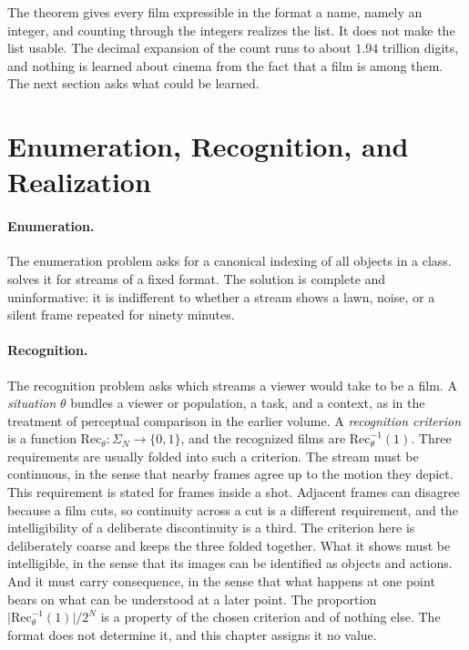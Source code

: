\documentclass[11pt,twoside,openright]{book}
\theoremstyle{plain}
\theoremstyle{definition}
\theoremstyle{remark}
\begin{document}
The theorem gives every film expressible in the format a name, namely an integer, and counting through the integers realizes the list. It does not make the list usable. The decimal expansion of the count runs to about $1.94$ trillion digits, and nothing is learned about cinema from the fact that a film is among them. The next section asks what could be learned.

\section{Enumeration, Recognition, and Realization}\label{sec:three}

\paragraph{Enumeration.} The enumeration problem asks for a canonical indexing of all objects in a class.  solves it for streams of a fixed format. The solution is complete and uninformative: it is indifferent to whether a stream shows a lawn, noise, or a silent frame repeated for ninety minutes.

\paragraph{Recognition.} The recognition problem asks which streams a viewer would take to be a film. A \emph{situation} $\theta$ bundles a viewer or population, a task, and a context, as in the treatment of perceptual comparison in the earlier volume. A \emph{recognition criterion} is a function $\mathrm{Rec}_\theta:\Sigma_N\to\{0,1\}$, and the recognized films are $\mathrm{Rec}_\theta^{-1}(1)$. Three requirements are usually folded into such a criterion. The stream must be continuous, in the sense that nearby frames agree up to the motion they depict. This requirement is stated for frames inside a shot. Adjacent frames can disagree because a film cuts, so continuity across a cut is a different requirement, and the intelligibility of a deliberate discontinuity is a third. The criterion here is deliberately coarse and keeps the three folded together. What it shows must be intelligible, in the sense that its images can be identified as objects and actions. And it must carry consequence, in the sense that what happens at one point bears on what can be understood at a later point. The proportion $\lvert\mathrm{Rec}_\theta^{-1}(1)\rvert/2^N$ is a property of the chosen criterion and of nothing else. The format does not determine it, and this chapter assigns it no value.
\end{document}

